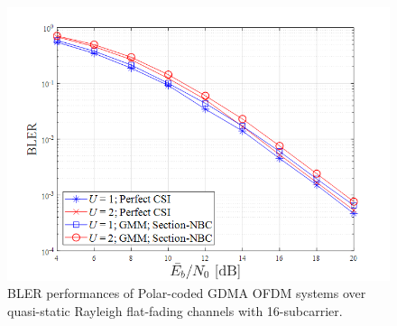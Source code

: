 \begin{figure}[t!]
 \centering
 \includegraphics[width=15cm]{fig/bler_gdma_ofdm_polar_sectionNBC.png}
 \caption{BLER performances of Polar-coded GDMA OFDM systems over quasi-static Rayleigh flat-fading channels with 16-subcarrier.}
 \label{fig:bler_gdma_ofdm_polar_sectionNBC}
\end{figure}




